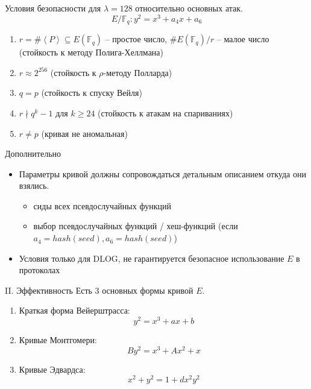 \documentclass{beamer}
\begin{document}
\begin{frame}{Условия безопасности для $\lambda = 128$ относительно основных атак.}
    \[E/\mathbb{F}_q: y^2 = x^3 + a_4 x + a_6\]
    \begin{enumerate}
        \item $r = \#\left<P\right> \subseteq E(\mathbb{F}_q)$ -- простое число, $\#E(\mathbb{F}_q) / r$ -- малое число (стойкость к методу Полига-Хеллмана)
        \item $r \approx 2^{256}$ (стойкость к $\rho$-методу Полларда) 
        \item $q = p$ (стойкость к спуску Вейля)
        \item $r \nmid q^k - 1$ для $k \geq 24$ (стойкость к атакам на спариваниях)
        \item $r \neq p$ (кривая не аномальная)
    \end{enumerate}
\end{frame}

\begin{frame}{Дополнительно}
    \begin{itemize}
        \item Параметры кривой должны сопровождаться детальным описанием откуда они взялись.
        \begin{itemize}
            \item сиды всех псевдослучайных функций
            \item выбор псевдослучайных функций / хеш-функций (если $a_4 = hash(seed), a_6 = hash(seed)$)
        \end{itemize}
        \item Условия только для DLOG, не гарантируется безопасное использование $E$ в протоколах
    \end{itemize}
\end{frame}


\begin{frame}{II. Эффективность}
Есть $3$ основных формы кривой $E$.
\begin{enumerate}
    \item Краткая форма Вейерштрасса:
    \[y^2 = x^3 + a x + b\]
    \item Кривые Монтгомери:
    \[
    B y^2 = x^3 + A x^2 + x
    \]
    \item Кривые Эдвардса:
    \[
    x^2 + y^2 = 1 + d x^2 y^2
    \]
\end{enumerate}
\end{frame}
\end{document}
